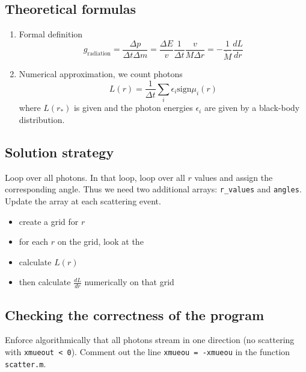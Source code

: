 \documentclass[../main/main.tex]{subfiles}
\begin{document}
\subsection{Theoretical formulas}
\begin{enumerate}
\item Formal definition
\begin{equation}
g_{\text{radiation}} =  \frac{\Delta p}{\Delta t \Delta m} = \frac{\Delta E}{v} \frac{1}{\Delta t} \frac{v}{M \Delta r} = - \frac{1}{\dot{M}}\frac{dL}{dr}
\end{equation}

\item Numerical approximation, we count photons
\begin{equation}
L(r) = \frac{1}{\Delta t} \sum_i \epsilon_i \text{sign}\mu_i(r)
\end{equation}
where $L(r_*)$ is given and the photon energies $\epsilon_i$ are given by a black-body distribution.
\end{enumerate}

\subsection{Solution strategy}
Loop over all photons. In that loop, loop over all $r$ values and assign the corresponding angle. Thus we need two additional arrays: \texttt{r\_values} and \texttt{angles}. Update the array at each scattering event.


\begin{itemize}
\item create a grid for $r$
\item for each $r$ on the grid, look at the 
\item calculate $L(r)$
\item then calculate $\frac{dL}{dr}$ numerically on that grid
\end{itemize}

\subsection{Checking the correctness of the program}
Enforce algorithmically that all photons stream in one direction (no scattering with \texttt{xmueout < 0}). Comment out the line \texttt{xmueou = -xmueou} in the function \texttt{scatter.m}.
\end{document}
